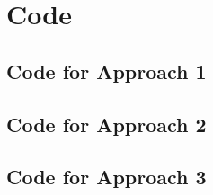 \documentclass{article}
\begin{document}
\appendix
\section{Code}
\subsection{Code for Approach 1}

\subsection{Code for Approach 2}

\subsection{Code for Approach 3}

\end{document}
